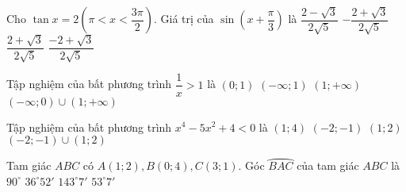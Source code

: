 \begin{ex}%
Cho $\tan x = 2 \left(\pi < x < \dfrac{3\pi}{2} \right) $. Giá trị của $\sin \left (x + \dfrac{\pi}{3}\right )$ là
\choice
{$\dfrac{2 - \sqrt{3}}{2\sqrt{5}}$}
{\True $-\dfrac{2 + \sqrt{3}}{2\sqrt{5}}$}
{$\dfrac{2 + \sqrt{3}}{2\sqrt{5}}$}
{$\dfrac{-2 + \sqrt{3}}{2\sqrt{5}}$}	
\end{ex}

\begin{ex}%
Tập nghiệm của bất phương trình $\dfrac{1}{x} > 1$ là
\choice
{\True $(0;1)$}
{$(-\infty;1)$}
{$(1;+\infty)$}
{$(-\infty;0) \cup (1;+\infty)$}	
\end{ex}

\begin{ex}%
Tập nghiệm của bất phương trình $x^4 - 5x^2 + 4 < 0$ là
\choice
{$(1;4)$}
{$(-2;-1)$}
{$(1;2)$}
{\True $(-2;-1) \cup (1;2)$}	
\end{ex}

\begin{ex}%
Tam giác $ABC$ có $A(1;2), B(0;4), C(3;1)$. Góc $\wideparen{BAC}$ của tam giác $ABC$ là
\choice
{$90^\circ$}
{$36^\circ 52'$}
{\True $143^\circ 7'$}
{$53^\circ 7'$}	
\end{ex}

